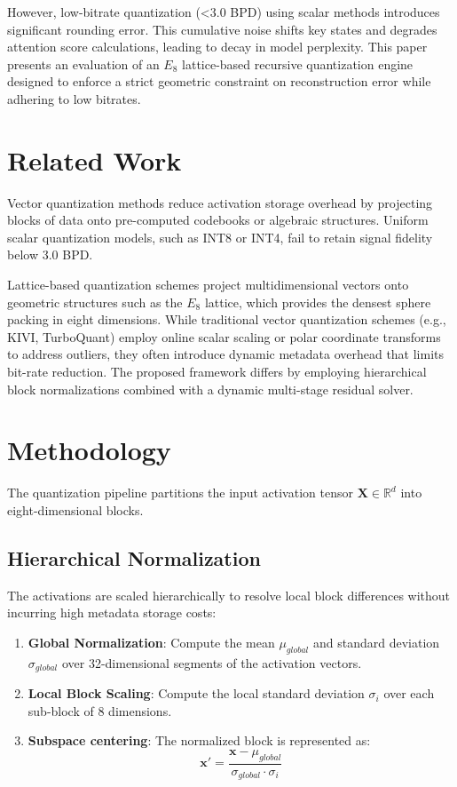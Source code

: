 \documentclass[journal,onecolumn,12pt]{IEEEtran}
\begin{document}
However, low-bitrate quantization (<3.0 BPD) using scalar methods introduces significant rounding error. This cumulative noise shifts key states and degrades attention score calculations, leading to decay in model perplexity. This paper presents an evaluation of an $E_8$ lattice-based recursive quantization engine designed to enforce a strict geometric constraint on reconstruction error while adhering to low bitrates.

\section{Related Work}
Vector quantization methods reduce activation storage overhead by projecting blocks of data onto pre-computed codebooks or algebraic structures. Uniform scalar quantization models, such as INT8 or INT4, fail to retain signal fidelity below 3.0 BPD. 

Lattice-based quantization schemes project multidimensional vectors onto geometric structures such as the $E_8$ lattice, which provides the densest sphere packing in eight dimensions. While traditional vector quantization schemes (e.g., KIVI, TurboQuant) employ online scalar scaling or polar coordinate transforms to address outliers, they often introduce dynamic metadata overhead that limits bit-rate reduction. The proposed framework differs by employing hierarchical block normalizations combined with a dynamic multi-stage residual solver.

\section{Methodology}
The quantization pipeline partitions the input activation tensor $\mathbf{X} \in \mathbb{R}^{d}$ into eight-dimensional blocks.

\subsection{Hierarchical Normalization}
The activations are scaled hierarchically to resolve local block differences without incurring high metadata storage costs:
\begin{enumerate}
    \item \textbf{Global Normalization}: Compute the mean $\mu_{global}$ and standard deviation $\sigma_{global}$ over 32-dimensional segments of the activation vectors.
    \item \textbf{Local Block Scaling}: Compute the local standard deviation $\sigma_i$ over each sub-block of 8 dimensions.
    \item \textbf{Subspace centering}: The normalized block is represented as:
    \begin{equation}
        \mathbf{x}' = \frac{\mathbf{x} - \mu_{global}}{\sigma_{global} \cdot \sigma_i}
    \end{equation}
\end{enumerate}
\end{document}
